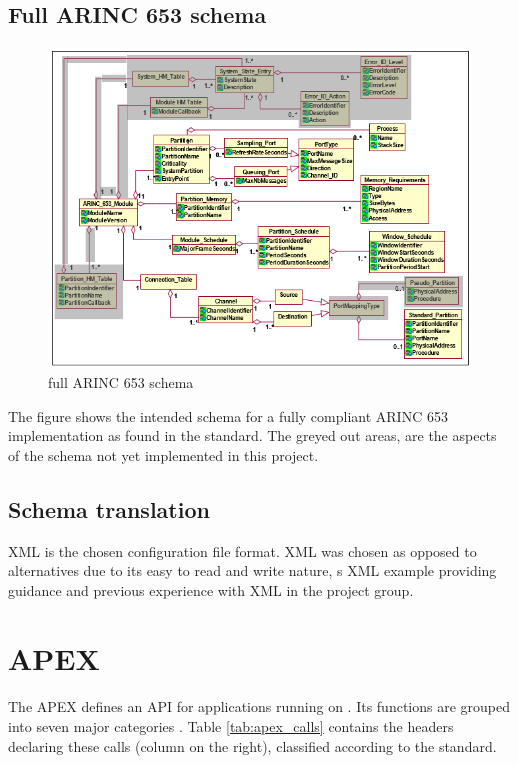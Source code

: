 \subsection{Full ARINC 653 schema}

\begin{figure}[H]
	\includegraphics{figures/originalschema.png}
	\caption{full ARINC 653 schema}
	\label{fig:arinc653schema}
\end{figure}

The figure shows the intended schema for a fully compliant ARINC 653 implementation
as found in the \arinc{} standard. The greyed out areas,
are the aspects of the \OSname{} schema not yet implemented in this project.


\subsection{Schema translation}
XML is the chosen configuration file format.
XML was chosen as opposed to alternatives due to its easy to read and write nature,
\arinc{}\textquotesingle{}s XML example providing guidance and previous experience with XML in the project group.


\section{APEX}
The APEX defines an API for applications running on \OSname{}.
Its functions are grouped into
seven major categories \cite{arinc_page_45}. Table \ref{tab:apex_calls}
contains the headers declaring these calls (column on the right),
classified according to the standard.

